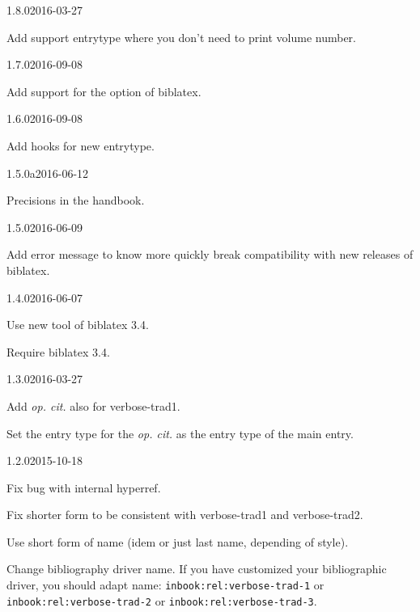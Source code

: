 \documentclass{ltxdockit}[2011/03/25]
\newcommand{\biblatex}{biblatex\xspace}
\begin{document}
\begin{changelog}

\begin{release}{1.8.0}{2016-03-27}
  \item Add support entrytype where you don't need to print volume number.
\end{release}

\begin{release}{1.7.0}{2016-09-08}
  \item Add support for the  option of \biblatex.
\end{release}

\begin{release}{1.6.0}{2016-09-08}
  \item Add hooks for new entrytype.
\end{release}

\begin{release}{1.5.0a}{2016-06-12}
  \item Precisions in the handbook.
\end{release}


\begin{release}{1.5.0}{2016-06-09}
  \item Add error message to know more quickly break compatibility with new releases of biblatex.
\end{release}

\begin{release}{1.4.0}{2016-06-07}
  \item Use new tool of biblatex 3.4.
  \item Require biblatex 3.4.
\end{release}
\begin{release}{1.3.0}{2016-03-27}
\item Add \emph{op. cit.} also for verbose-trad1.
\item Set the entry type for the \emph{op. cit.} as the entry type of the main entry.
\end{release}

\begin{release}{1.2.0}{2015-10-18}
\item Fix bug with internal hyperref.
\item Fix shorter form to be consistent with verbose-trad1 and verbose-trad2.
\item Use short form of name (idem or just last name, depending of style).
\item Change bibliography driver name. If you have customized your bibliographic driver, you should adapt name: \verb+inbook:rel:verbose-trad-1+ or \verb+inbook:rel:verbose-trad-2+ or \verb+inbook:rel:verbose-trad-3+.
\end{release}


\end{changelog}
\end{document}
